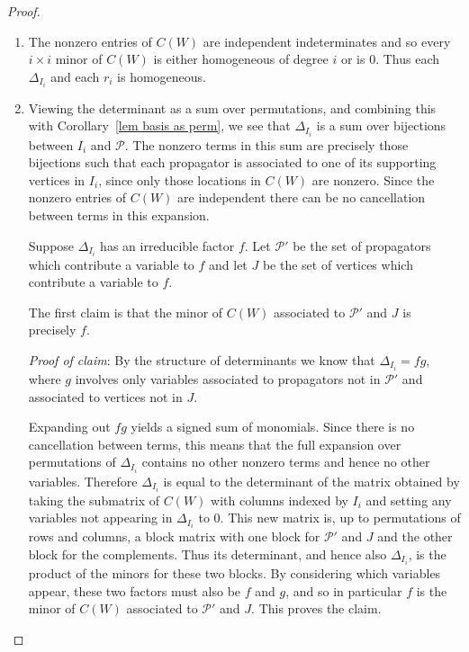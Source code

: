 \documentclass[11pt]{article}
\theoremstyle{remark}
\theoremstyle{definition}
\begin{document}
\begin{proof}
\begin{enumerate}
    \item The nonzero entries of $C(W)$ are independent indeterminates and so every $i\times i$ minor of $C(W)$ is either homogeneous of degree $i$ or is $0$.  Thus each $\Delta_{I_i}$ and each $r_i$ is homogeneous.  %
    \item Viewing the determinant as a sum over permutations, and combining this with Corollary~\ref{lem basis as perm}, we see that $\Delta_{I_i}$ is a sum over bijections between $I_i$ and $\mathcal{P}$.  The nonzero terms in this sum are precisely those bijections such that each propagator is associated to one of its supporting vertices in $I_i$, since only those locations in $C(W)$ are nonzero.  Since the nonzero entries of $C(W)$ are independent there can be no cancellation between terms in this expansion. 

Suppose $\Delta_{I_i}$ has an irreducible factor $f$.  Let $\mathcal{P}'$ be the set of propagators which contribute a variable to $f$ and let $J$ be the set of vertices which contribute a variable to $f$.

The first claim is that the minor of $C(W)$ associated to $\mathcal{P}'$ and $J$ is precisely $f$.

{\em Proof of claim}: By the structure of determinants we know that $\Delta_{I_i} = fg$, where $g$ involves only variables associated to propagators not in $\mathcal{P}'$ and associated to vertices not in $J$.

Expanding out $fg$ yields a signed sum of monomials. Since there is no cancellation between terms, this means that the full expansion over permutations of $\Delta_{I_i}$ contains no other nonzero terms and hence no other variables.  Therefore $\Delta_{I_i}$ is equal to the determinant of the matrix obtained by taking the submatrix of $C(W)$ with columns indexed by $I_i$ and setting any variables not appearing in $\Delta_{I_i}$ to $0$.  This new matrix is, up to permutations of rows and columns, a block matrix with one block for $\mathcal{P}'$ and $J$ and the other block for the complements.  Thus its determinant, and hence also $\Delta_{I_i}$, is the product of the minors for these two blocks.  By considering which variables appear, these two factors must also be $f$ and $g$, and so in particular $f$ is the minor of $C(W)$ associated to $\mathcal{P}'$ and $J$.  This proves the claim.


\end{enumerate}
\end{proof}
\end{document}
